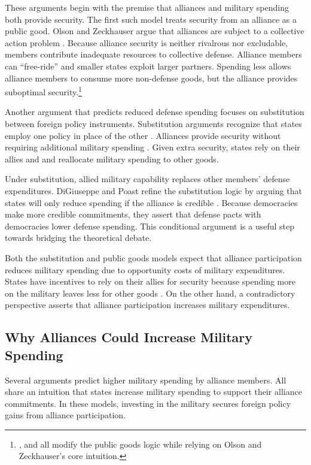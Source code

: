 \documentclass[12pt]{article}
\begin{document}
These arguments begin with the premise that alliances and military spending both provide security.
The first such model treats security from an alliance as a public good. 
Olson and Zeckhauser argue that alliances are subject to a collective action problem \citep{OlsonZeckhauser1966}.
Because alliance security is neither rivalrous nor excludable, members contribute inadequate resources to collective defense. 
Alliance members can ``free-ride'' and smaller states exploit larger partners. 
Spending less allows alliance members to consume more non-defense goods, but the alliance provides suboptimal security.\footnote{\citet{SandlerForbes1980}, \citet{Oneal1990} and \citet{SandlerHartley2001} all modify the public goods logic while relying on Olson and Zeckhauser's core intuition.} 


Another argument that predicts reduced defense spending focuses on substitution between foreign policy instruments.
Substitution arguments recognize that states employ one policy in place of the other \citep{MostStarr1989}.
Alliances provide security without requiring additional military spending \citep{Morrow1993, Conybeare1994}. 
Given extra security, states rely on their allies and and reallocate military spending to other goods. 


Under substitution, allied military capability replaces other members' defense expenditures. 
DiGiuseppe and Poast refine the substitution logic by arguing that states will only reduce spending if the alliance is credible \citep{DigiuseppePoast2016}.
Because democracies make more credible commitments, they assert that defense pacts with democracies lower defense spending.
This conditional argument is a useful step towards bridging the theoretical debate. 


Both the substitution and public goods models expect that alliance participation reduces military spending due to opportunity costs of military expenditures. 
States have incentives to rely on their allies for security because spending more on the military leaves less for other goods \citep{Fordham1998, Fearon2018}.
On the other hand, a contradictory perspective asserts that alliance participation increases military expenditures. 


\subsection{Why Alliances Could Increase Military Spending}


Several arguments predict higher military spending by alliance members.
All share an intuition that states increase military spending to support their alliance commitments. 
In these models, investing in the military secures foreign policy gains from alliance participation. 
\end{document}
